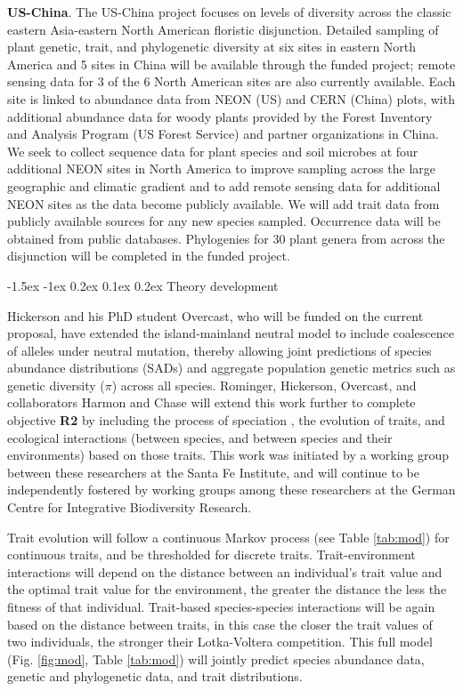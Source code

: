 \documentclass[11pt]{article}
\makeatletter
\renewcommand\subsubsection{\@startsection{subsection}{1}{\z@}%
                                  {-1.5ex \@plus -1ex \@minus 0.2ex}%
                                  {0.1ex \@plus 0.2ex}%
                                  {\normalfont\bfseries}}
\makeatother
\begin{document}
\textbf{US-China}. The US-China project focuses on levels of diversity
across the classic eastern Asia-eastern North American floristic
disjunction. Detailed sampling of plant genetic, trait, and
phylogenetic diversity at six sites in eastern North America and 5
sites in China will be available through the funded project; remote
sensing data for 3 of the 6 North American sites are also currently
available. Each site is linked to abundance data from NEON (US) and
CERN (China) plots, with additional abundance data for woody plants
provided by the Forest Inventory and Analysis Program (US Forest
Service) and partner organizations in China. We seek to collect
sequence data for plant species and soil microbes at four additional
NEON sites in North America to improve sampling across the large
geographic and climatic gradient and to add remote sensing data for
additional NEON sites as the data become publicly available. We will
add trait data from publicly available sources for any new species
sampled. Occurrence data will be obtained from public
databases. Phylogenies for 30 plant genera from across the disjunction
will be completed in the funded project.


\subsubsection{Theory development}\label{theory-development}

Hickerson and his PhD student Overcast, who will be funded on the
current proposal, have extended the island-mainland neutral model
\cite{Rosindell2013-di} to include coalescence of alleles under
neutral mutation, thereby allowing joint predictions of species
abundance distributions (SADs) and aggregate population genetic
metrics such as genetic diversity ($\pi$) across all
species. Rominger, Hickerson, Overcast, and collaborators Harmon and
Chase will extend this work further to complete objective \textbf{R2}
by including the process of speciation \cite{Rosindell2010-gq}, the
evolution of traits, and ecological interactions (between species, and
between species and their environments) based on those traits. This
work was initiated by a working group between these researchers at the
Santa Fe Institute, and will continue to be independently fostered by
working groups among these researchers at the German Centre for
Integrative Biodiversity Research.

Trait evolution will follow a continuous Markov process (see Table
\ref{tab:mod}) for continuous traits, and be thresholded
\cite{Felsenstein2012-aj} for discrete traits. Trait-environment
interactions will depend on the distance between an individual's trait
value and the optimal trait value for the environment, the greater the
distance the less the fitness of that individual. Trait-based
species-species interactions will be again based on the distance
between traits, in this case the closer the trait values of two
individuals, the stronger their Lotka-Voltera \cite{Wilson2003-kp}
competition. This full model (Fig. \ref{fig:mod}, Table \ref{tab:mod})
will jointly predict species abundance data, genetic and phylogenetic
data, and trait distributions.
\end{document}
